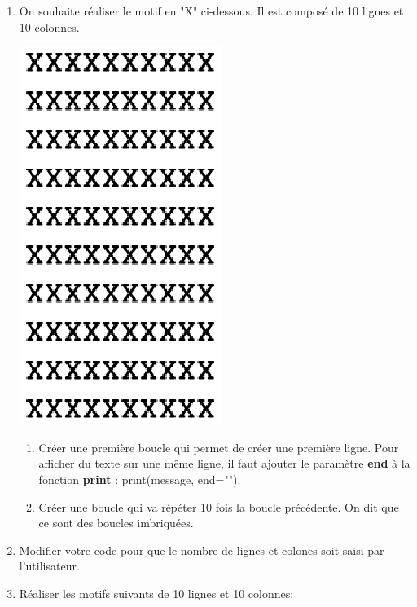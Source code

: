 \documentclass[11pt,a4paper]{article}
\begin{document}
\begin{enumerate}
\item On souhaite réaliser le motif en "X" ci-dessous. Il est composé de 10 lignes et 10 colonnes.
\begin{center}
\includegraphics[scale=0.5]{img/carreX.eps}
\end{center}
\begin{enumerate}
\item Créer une première boucle qui permet de créer une première ligne. Pour afficher du texte sur une même ligne, il faut ajouter le paramètre \textbf{end} à la fonction \textbf{print} : print(message, end="").
\item Créer une boucle qui va répéter 10 fois la boucle précédente. On dit que ce sont des boucles imbriquées.
\end{enumerate}
\item Modifier votre code pour que le nombre de lignes et colones soit saisi par l'utilisateur.
\item Réaliser les motifs suivants de 10 lignes et 10 colonnes:


\end{enumerate}
\end{document}
